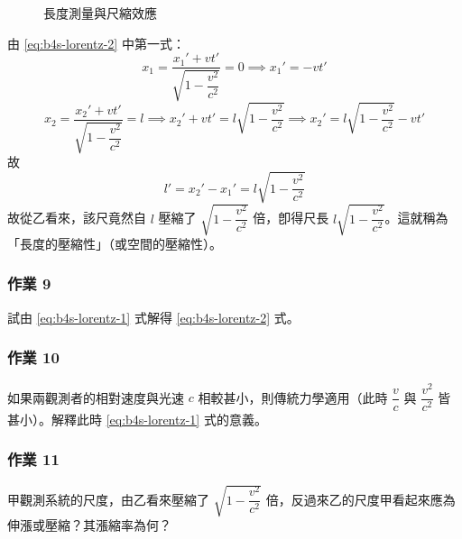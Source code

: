 \begin{enumerate}[(i)]
\begin{figure}[H]
  \caption{長度測量與尺縮效應}
  \label{fig:b4s-2-8}
  \end{figure}

  由 \eqref{eq:b4s-lorentz-2} 中第一式：
  \[ x_1 = \frac{x_1' + vt'}{\sqrt{1 - \dfrac{v^2}{c^2}}} = 0 \implies x_1' = -vt' \]
  \[ x_2 = \frac{x_2' + vt'}{\sqrt{1 - \dfrac{v^2}{c^2}}} = l \implies x_2' + vt' = l\sqrt{1 - \frac{v^2}{c^2}} \implies x_2' = l\sqrt{1 - \frac{v^2}{c^2}} - vt' \]
  故
  \[ l' = x_2' - x_1' = l\sqrt{1 - \frac{v^2}{c^2}} \]
  故從乙看來，該尺竟然自 $l$ 壓縮了 $\sqrt{1 - \dfrac{v^2}{c^2}}$ 倍，卽得尺長 $l\sqrt{1 - \dfrac{v^2}{c^2}}$。這就稱為「長度的壓縮性」（或空間的壓縮性）。
\end{enumerate}

\subsubsection*{作業 9}
試由 \eqref{eq:b4s-lorentz-1} 式解得 \eqref{eq:b4s-lorentz-2} 式。

\subsubsection*{作業 10}
如果兩觀測者的相對速度與光速 $c$ 相較甚小，則傳統力學適用（此時 $\dfrac{v}{c}$ 與 $\dfrac{v^2}{c^2}$ 皆甚小）。解釋此時 \eqref{eq:b4s-lorentz-1} 式的意義。

\subsubsection*{作業 11}
甲觀測系統的尺度，由乙看來壓縮了 $\sqrt{1 - \dfrac{v^2}{c^2}}$ 倍，反過來乙的尺度甲看起來應為伸漲或壓縮？其漲縮率為何？

